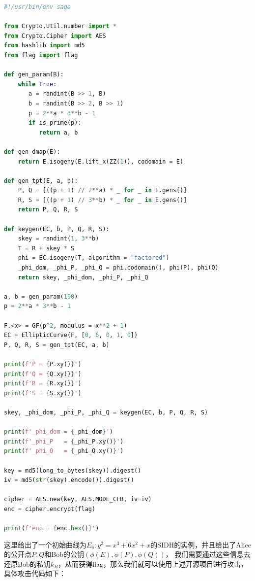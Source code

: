 \documentclass{book}
\numberwithin{equation}{subsubsection}
\begin{document}
\begin{lstlisting}[language=Python,basicstyle=\ttfamily,breaklines=true,keywordstyle=\bfseries\color{blue}]
#!/usr/bin/env sage  
  
from Crypto.Util.number import *  
from Crypto.Cipher import AES  
from hashlib import md5  
from flag import flag  
  
def gen_param(B):  
    while True:  
       a = randint(B >> 1, B)  
       b = randint(B >> 2, B >> 1)  
       p = 2**a * 3**b - 1  
       if is_prime(p):  
          return a, b  
  
def gen_dmap(E):  
    return E.isogeny(E.lift_x(ZZ(1)), codomain = E)  
  
def gen_tpt(E, a, b):  
    P, Q = [((p + 1) // 2**a) * _ for _ in E.gens()]  
    R, S = [((p + 1) // 3**b) * _ for _ in E.gens()]  
    return P, Q, R, S  
  
def keygen(EC, b, P, Q, R, S):  
    skey = randint(1, 3**b)  
    T = R + skey * S  
    phi = EC.isogeny(T, algorithm = "factored")  
    _phi_dom, _phi_P, _phi_Q = phi.codomain(), phi(P), phi(Q)  
    return skey, _phi_dom, _phi_P, _phi_Q  
  
a, b = gen_param(190)  
p = 2**a * 3**b - 1  
  
F.<x> = GF(p^2, modulus = x**2 + 1)  
EC = EllipticCurve(F, [0, 6, 0, 1, 0])  
P, Q, R, S = gen_tpt(EC, a, b)  
  
print(f'P = {P.xy()}')  
print(f'Q = {Q.xy()}')  
print(f'R = {R.xy()}')  
print(f'S = {S.xy()}')  
  
skey, _phi_dom, _phi_P, _phi_Q = keygen(EC, b, P, Q, R, S)  
  
print(f'_phi_dom = {_phi_dom}')  
print(f'_phi_P   = {_phi_P.xy()}')  
print(f'_phi_Q   = {_phi_Q.xy()}')  
  
key = md5(long_to_bytes(skey)).digest()  
iv = md5(str(skey).encode()).digest()  
  
cipher = AES.new(key, AES.MODE_CFB, iv=iv)  
enc = cipher.encrypt(flag)  
  
print(f'enc = {enc.hex()}')
\end{lstlisting}
这里给出了一个初始曲线为$E_6:y^2 = x^3 + 6x^2 + x$的SIDH的实例，并且给出了Alice的公开点$P,Q$和Bob的公钥$(\phi(E),\phi(P),\phi(Q))$，
我们需要通过这些信息去还原Bob的私钥$k_B$，从而获得flag，那么我们就可以使用上述开源项目进行攻击，具体攻击代码如下：
\end{document}
